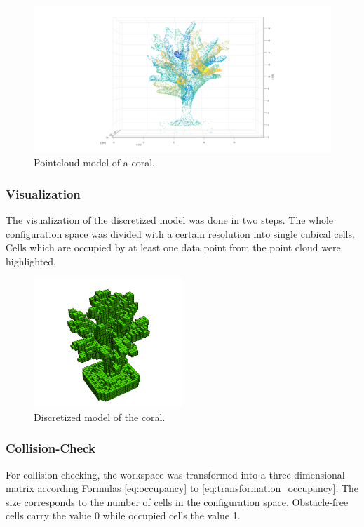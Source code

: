 \begin{figure} [h]
	\centering
	\includegraphics[width=1\textwidth]{images/pointcloud.png}
	\caption{Pointcloud model of a coral.}
	\label{pics:pointcloud}
\end{figure}

\subsubsection{Visualization}
The visualization of the discretized model was done in two steps. The whole configuration space was divided with a certain resolution into single cubical cells. Cells which are occupied by at least one data point from the point cloud were highlighted.    

\begin{figure} [h]
	\centering
	\includegraphics[width=0.5\textwidth]{images/discretized.png}
	\caption{Discretized model of the coral.}
	\label{pics:discretized}
\end{figure}

\subsubsection{Collision-Check}
For collision-checking, the workspace was transformed into a three dimensional matrix according Formulas \ref{eq:occupancy} to \ref{eq:transformation_occupancy}. The size corresponds to the number of cells in the configuration space. Obstacle-free cells carry the value 0 while occupied cells the value 1. 

